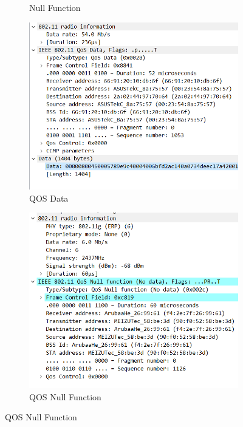 \documentclass[a4paper,twoside]{article}
\begin{document}
\begin{spacing}{1.2}
\begin{figure}[H]
\begin{subfigure}{0.4\textwidth}
		\caption{Null Function}
		\label{fig:nf}
	\end{subfigure}
	\begin{subfigure}{0.4\textwidth}
		\centering
		\includegraphics[width=\textwidth]{qos_data.png}
		\caption{QOS Data}
		\label{fig:qd}
	\end{subfigure}
	\begin{subfigure}{0.4\textwidth}
		\centering
		\includegraphics[width=\textwidth]{qos_nf.png}
		\caption{QOS Null Function}
		\label{fig:qnf}
	\end{subfigure}
\end{figure}



\end{spacing}
\end{document}

